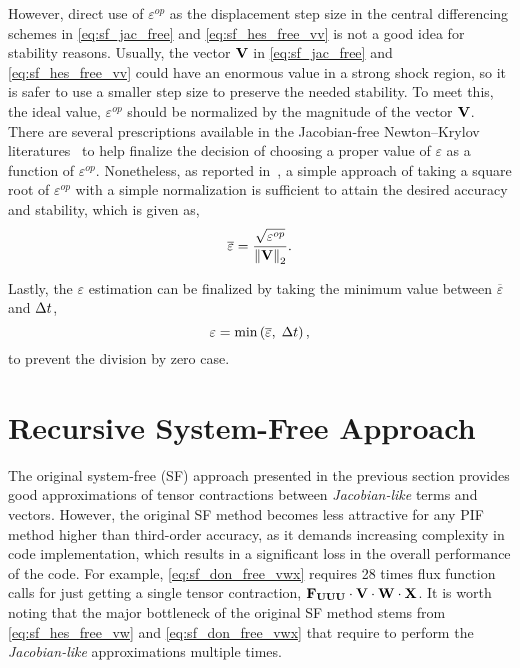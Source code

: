 However, direct use of \( \varepsilon^{op} \) as
the displacement step size in the central differencing schemes
in \cref{eq:sf_jac_free} and \cref{eq:sf_hes_free_vv}
is not a good idea for stability reasons.
%
Usually, the vector \( \mathbf{V} \) in
\cref{eq:sf_jac_free} and \cref{eq:sf_hes_free_vv} could have an
enormous value in a strong shock region, so it is safer to use
a smaller step size to preserve the needed stability. To meet this,
the ideal value, \( \varepsilon^{op} \) should be normalized
by the magnitude of the vector \( \mathbf{V} \).
%
There are several prescriptions available
in the Jacobian-free Newton–Krylov 
literatures~\cite{knoll2004jacobian, brown1990hybrid}
to help finalize the decision of choosing a proper value of \( \varepsilon \)
as a function of  \( \varepsilon^{op} \).
%
Nonetheless, as reported in~\cite{lee2021single},
a simple approach of
taking a square root of \( \varepsilon^{op} \)
with a simple normalization is sufficient to attain the desired accuracy and stability,
which is given as,
%
\begin{equation}\label{eq:sf_epsilon_norm}
    \overline{\varepsilon} = \frac{\sqrt{\varepsilon^{op}}}{\left\lVert \mathbf{V} \right\rVert_{2}}.
\end{equation}

Lastly,
the \( \varepsilon \) estimation can be finalized
by taking the minimum value between $\overline{\varepsilon}$ and $\Delta t$,
%
\begin{equation}\label{eq:sf_epsilon_min_dt}
    \varepsilon = \min \left( \overline{\varepsilon}, \; \Delta t  \right),
\end{equation}
to prevent the division by zero case.


\section{Recursive System-Free Approach}\label{sec:recursive_sf}

The original system-free (SF) approach presented in the previous section
provides good approximations of tensor contractions between \textit{Jacobian-like} terms and vectors.
However, the original SF method becomes less attractive for
any PIF method higher than third-order accuracy,
as it demands increasing complexity in code implementation,
which results in a significant loss in the overall performance of the code.
For example, \cref{eq:sf_don_free_vwx} requires 28 times flux function calls
for just getting a single tensor contraction, \( \mathbf{F}_{\mathbf{U}\mathbf{U}\mathbf{U}} \cdot \mathbf{V} \cdot \mathbf{W} \cdot \mathbf{X} \).
It is worth noting that the major bottleneck of the original SF method
stems from \cref{eq:sf_hes_free_vw} and \cref{eq:sf_don_free_vwx}
that require to perform the \textit{Jacobian-like} approximations multiple times.

